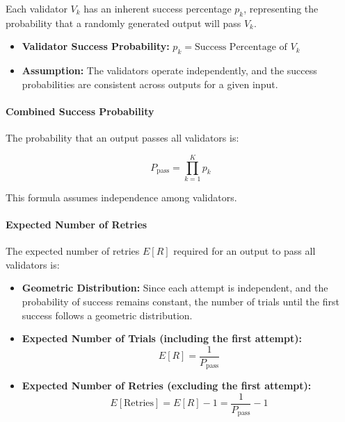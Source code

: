 \documentclass{article}
\begin{document}
Each validator \( V_k \) has an inherent success percentage \( p_k \), representing the probability that a randomly generated output will pass \( V_k \).

\begin{itemize}
    \item \textbf{Validator Success Probability:} \( p_k = \text{Success Percentage of } V_k \)
    \item \textbf{Assumption:} The validators operate independently, and the success probabilities are consistent across outputs for a given input.
\end{itemize}

\paragraph{Combined Success Probability}

The probability that an output passes all validators is:

\begin{equation*}
P_{\text{pass}} = \prod_{k=1}^{K} p_k
\end{equation*}

This formula assumes independence among validators.

\paragraph{Expected Number of Retries}

The expected number of retries \( E[R] \) required for an output to pass all validators is:

\begin{itemize}
    \item \textbf{Geometric Distribution:} Since each attempt is independent, and the probability of success remains constant, the number of trials until the first success follows a geometric distribution.
    \item \textbf{Expected Number of Trials (including the first attempt):}
    \begin{equation*}
    E[R] = \frac{1}{P_{\text{pass}}}
    \end{equation*}
    \item \textbf{Expected Number of Retries (excluding the first attempt):}
    \begin{equation*}
    E[\text{Retries}] = E[R] - 1 = \frac{1}{P_{\text{pass}}} - 1
    \end{equation*}
\end{itemize}
\end{document}
